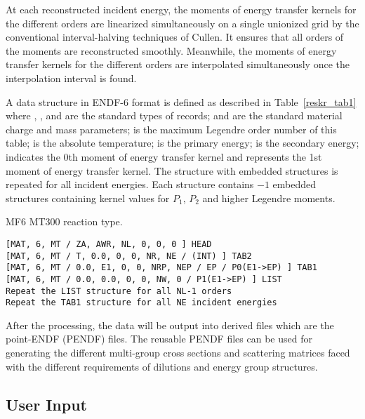 At each reconstructed incident energy, the moments of energy transfer
kernels for the different orders are linearized simultaneously on a
single unionized grid by the conventional interval-halving techniques
of Cullen\cite{SIGMA1}. It ensures that all orders of the moments are
reconstructed smoothly. Meanwhile, the moments of energy transfer kernels
for the different orders are interpolated simultaneously once the
interpolation interval is found.

A data structure in ENDF-6 format is defined as described in
Table~\ref{reskr_tab1} where , ,  and
 are the standard types of records;  and 
are the standard material charge and mass parameters;  is the
maximum Legendre order number of this table;  is the absolute
temperature;  is the primary energy;  is the secondary
energy;  indicates the 0th moment of energy transfer kernel and
 represents the 1st moment of energy transfer kernel. The
 structure with embedded  structures is repeated
for all  incident energies. Each  structure contains
$-1$ embedded  structures containing kernel values for
$P_1$, $P_2$ and higher Legendre moments.

\begin{table}[t]
\caption[MF6 MT300 reaction type.]{MF6 MT300 reaction type.}
\begin{center}
\begin{BVerbatim}
[MAT, 6, MT / ZA, AWR, NL, 0, 0, 0 ] HEAD
[MAT, 6, MT / T, 0.0, 0, 0, NR, NE / (INT) ] TAB2
[MAT, 6, MT / 0.0, E1, 0, 0, NRP, NEP / EP / P0(E1->EP) ] TAB1
[MAT, 6, MT / 0.0, 0.0, 0, 0, NW, 0 / P1(E1->EP) ] LIST
Repeat the LIST structure for all NL-1 orders
Repeat the TAB1 structure for all NE incident energies
\end{BVerbatim}
\label{reskr_tab1}
\end{center}
\end{table}

After the processing, the data will be output into derived files which are the
point-ENDF (PENDF) files. The reusable PENDF files can be used for generating
the different multi-group cross sections and scattering matrices faced with
the different requirements of dilutions and energy group structures.

\subsection{User Input}
\label{ssRESKR_UserInp}

